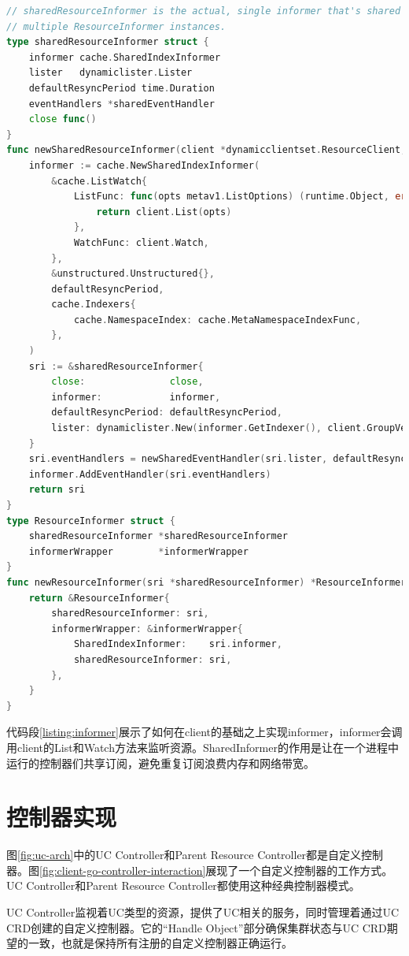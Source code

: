 \documentclass[macfonts,master]{njuthesis}
\begin{document}
\newpage
\begin{lstlisting}[language=Go,caption=通知器（Informer）实现,label=listing:informer]
// sharedResourceInformer is the actual, single informer that's shared by
// multiple ResourceInformer instances.
type sharedResourceInformer struct {
	informer cache.SharedIndexInformer
	lister   dynamiclister.Lister
	defaultResyncPeriod time.Duration
	eventHandlers *sharedEventHandler
	close func()
}
func newSharedResourceInformer(client *dynamicclientset.ResourceClient, defaultResyncPeriod time.Duration, close func()) *sharedResourceInformer {
	informer := cache.NewSharedIndexInformer(
		&cache.ListWatch{
			ListFunc: func(opts metav1.ListOptions) (runtime.Object, error) {
				return client.List(opts)
			},
			WatchFunc: client.Watch,
		},
		&unstructured.Unstructured{},
		defaultResyncPeriod,
		cache.Indexers{
			cache.NamespaceIndex: cache.MetaNamespaceIndexFunc,
		},
	)
	sri := &sharedResourceInformer{
		close:               close,
		informer:            informer,
		defaultResyncPeriod: defaultResyncPeriod,
		lister: dynamiclister.New(informer.GetIndexer(), client.GroupVersionResource()),
	}
	sri.eventHandlers = newSharedEventHandler(sri.lister, defaultResyncPeriod)
	informer.AddEventHandler(sri.eventHandlers)
	return sri
}
type ResourceInformer struct {
	sharedResourceInformer *sharedResourceInformer
	informerWrapper        *informerWrapper
}
func newResourceInformer(sri *sharedResourceInformer) *ResourceInformer {
	return &ResourceInformer{
		sharedResourceInformer: sri,
		informerWrapper: &informerWrapper{
			SharedIndexInformer:    sri.informer,
			sharedResourceInformer: sri,
		},
	}
}
\end{lstlisting}

代码段\ref{listing:informer}展示了如何在client的基础之上实现informer，informer会调用client的List和Watch方法来监听资源。SharedInformer的作用是让在一个进程中运行的控制器们共享订阅，避免重复订阅浪费内存和网络带宽。

\section{控制器实现}

图\ref{fig:uc-arch}中的UC Controller和Parent Resource Controller都是自定义控制器。图\ref{fig:client-go-controller-interaction}展现了一个自定义控制器的工作方式。UC Controller和Parent Resource Controller都使用这种经典控制器模式。

UC Controller监视着UC类型的资源，提供了UC相关的服务，同时管理着通过UC CRD创建的自定义控制器。它的``Handle Object''部分确保集群状态与UC CRD期望的一致，也就是保持所有注册的自定义控制器正确运行。
\end{document}
